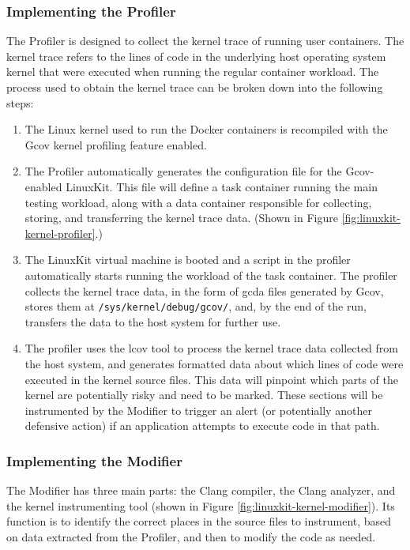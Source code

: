\subsubsection{Implementing the Profiler}
\label{sec.implementation.profiler}
The Profiler is designed to collect the kernel trace of running user containers.
The kernel trace refers to the lines of code in the underlying host operating system kernel that were executed when running the regular container workload. 
The process used to obtain the kernel trace can be broken down into the following steps: 
\begin{enumerate}
	\item The Linux kernel used to run the Docker containers is recompiled with the Gcov \cite{gcov} kernel profiling feature enabled. 
	\item The Profiler automatically generates the configuration file for the Gcov-enabled LinuxKit. This file will define a task container running the main testing workload, along with a data container responsible for collecting, storing, and transferring the kernel trace data. (Shown in Figure \ref{fig:linuxkit-kernel-profiler}.) 
	\item The LinuxKit virtual machine is booted and a script in the profiler automatically starts running the workload of the task container. The profiler collects the kernel trace data, in the form of gcda files generated by Gcov, stores them at \texttt{/sys/kernel/debug/gcov/}, and, by the end of the run, transfers the data to the host system for further use. 
	\item The profiler uses the lcov \cite{lcov} tool to process the kernel trace data collected from the host system, and generates formatted data about which lines of code were executed in the kernel source files. This data will pinpoint which parts of the kernel are potentially risky and need to be marked. These sections will be instrumented by the Modifier to trigger an alert (or potentially another defensive action) if an application attempts to execute code in that path. 
\end{enumerate}

\subsubsection{Implementing the Modifier}
\label{sec.implementation.modifier}
The Modifier has three main parts: the Clang compiler, the Clang analyzer, and the kernel instrumenting tool (shown in Figure \ref{fig:linuxkit-kernel-modifier}). 
Its function is to identify the correct places in the source files to instrument, based on data extracted from the Profiler, and then to modify the code as needed. 

